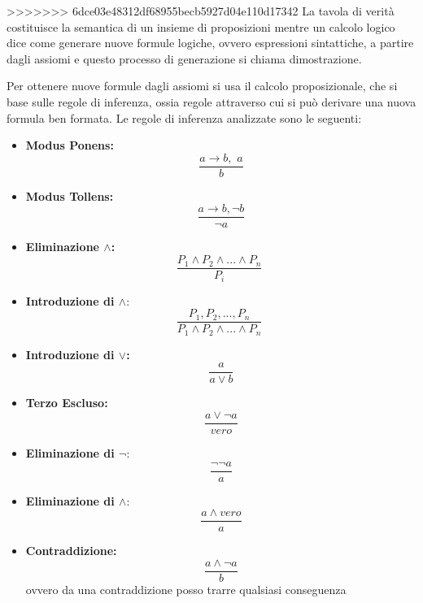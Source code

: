 \documentclass[a4paper]{book}
\begin{document}
>>>>>>> 6dce03e48312df68955becb5927d04e110d17342
La tavola di verità costituisce la semantica di un insieme di proposizioni mentre un calcolo logico dice come generare nuove formule logiche,
ovvero espressioni sintattiche, a partire dagli assiomi e questo processo di generazione si chiama dimostrazione.

Per ottenere nuove formule dagli assiomi si usa il calcolo proposizionale, che si base sulle regole di inferenza, ossia regole attraverso
cui si può derivare una nuova formula ben formata.\newline
Le regole di inferenza analizzate sono le seguenti:
\begin{itemize}
\item \textbf{Modus Ponens:}
  \begin{equation*}
    \frac{a\to b,\,\,a}{b}
  \end{equation*}
\item \textbf{Modus Tollens:}
  \begin{equation*}
    \frac{a\to b, \neg b}{\neg a}
  \end{equation*}
\item \textbf{Eliminazione $\land$:}
  \begin{equation*}
    \frac{P_1\land P_2 \land ... \land P_n}{P_i}\,\,
  \end{equation*}
\item \textbf{Introduzione di $\land$}:
  \begin{equation*}
    \frac{P_1, P_2,...,P_n}{P_1\land P_2 \land ... \land P_n}\,\,
  \end{equation*}
\item \textbf{Introduzione di $\lor$:}
  \begin{equation*}
    \frac{a}{a \lor b}
  \end{equation*}
\item \textbf{Terzo Escluso:}
  \begin{equation*}
    \frac{a \lor \neg a}{vero}
  \end{equation*}

\item \textbf{Eliminazione di $\neg$}:
  \begin{equation*}
    \frac{\neg \neg a}{a}
  \end{equation*}

\item \textbf{Eliminazione di $\land$}:
  \begin{equation*}
    \frac{a \land vero}{a}
  \end{equation*}
\item \textbf{Contraddizione:}
  \begin{equation*}
    \frac{a \land \neg a}{b}
  \end{equation*}
ovvero da una contraddizione posso trarre qualsiasi conseguenza
\end{itemize}
\end{document}
